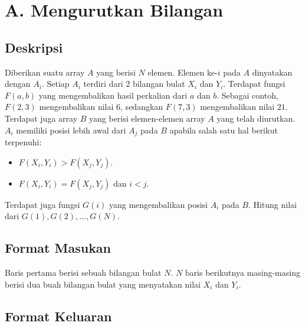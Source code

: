 \documentclass{article}
\begin{document}
\section*{\hfil A. Mengurutkan Bilangan\hfil}


\subsection*{Deskripsi}

\par\noindent Diberikan suatu array $A$ yang berisi $N$ elemen. Elemen ke-$i$ pada $A$ dinyatakan dengan $A_i$. Setiap $A_i$ terdiri dari $2$ bilangan bulat $X_i$ dan $Y_i$. Terdapat fungsi $F(a,b)$ yang mengembalikan hasil perkalian dari $a$ dan $b$. Sebagai contoh, $F(2,3)$ mengembalikan nilai $6$, sedangkan $F(7,3)$ mengembalikan nilai $21$. Terdapat juga array $B$ yang berisi elemen-elemen array $A$ yang telah diurutkan. $A_i$ memiliki posisi lebih awal dari $A_j$ pada $B$ apabila salah satu hal berikut terpenuhi:

\begin{itemize}
	\item $F(X_i,Y_i) > F(X_j, Y_j)$.
	\item $F(X_i,Y_i) = F(X_j, Y_j)$ dan $i < j$.
\end{itemize}

\par\noindent Terdapat juga fungsi $G(i)$ yang mengembalikan posisi $A_i$ pada $B$. Hitung nilai dari $G(1), G(2), ... , G(N)$. 

\subsection*{Format Masukan}

\par\noindent Baris pertama berisi sebuah bilangan bulat $N$. $N$ baris berikutnya masing-masing berisi dua buah bilangan bulat yang menyatakan nilai $X_i$ dan $Y_i$.

\subsection*{Format Keluaran}
\end{document}
